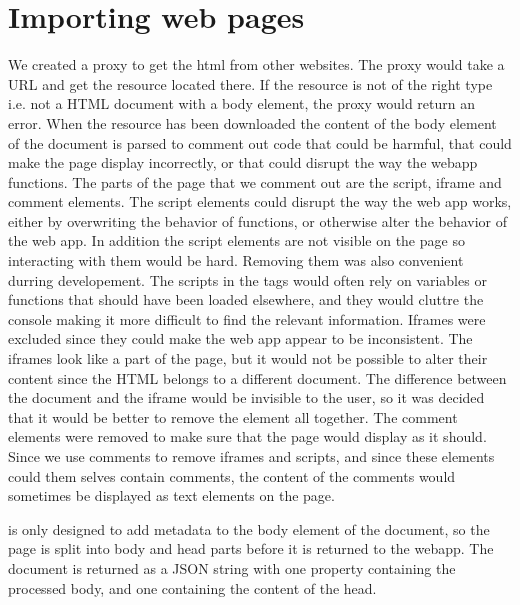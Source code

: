 
\section{Importing web pages}
We created a proxy to get the html from other websites.
The proxy would take a URL and get the resource located there.
If the resource is not of the right type i.e. not a HTML document with a body element,
the proxy would return an error.
When the resource has been downloaded the content of the body element of the document is parsed to comment out code that
could be harmful, that could make the page display incorrectly, or that could disrupt the way the webapp functions.
The parts of the page that we comment out are the script, iframe and comment elements.
The script elements could disrupt the way the web app works, either by overwriting the behavior of functions,
or otherwise alter the behavior of the web app.
In addition the script elements are not visible on the page so interacting with them would be hard.
Removing them was also convenient durring developement.
The scripts in the tags would often rely on variables or functions that should have been loaded elsewhere,
and they would cluttre the console making it more difficult to find the relevant information.
Iframes were excluded since they could make the web app appear to be inconsistent.
The iframes look like a part of the page,
but it would not be possible to alter their content since the HTML belongs to a different document.
The difference between the document and the iframe would be invisible to the user,
so it was decided that it would be better to remove the element all together.
The comment elements were removed to make sure that the page would display as it should.
Since we use comments to remove iframes and scripts, and since these elements could them selves contain comments,
the content of the comments would sometimes be displayed as text elements on the page.

\Theartefact is only designed to add metadata to the body element of the document,
so the page is split into body and head parts before it is returned to the webapp.
The document is returned as a JSON string with one property containing the processed body,
and one containing the content of the head.


